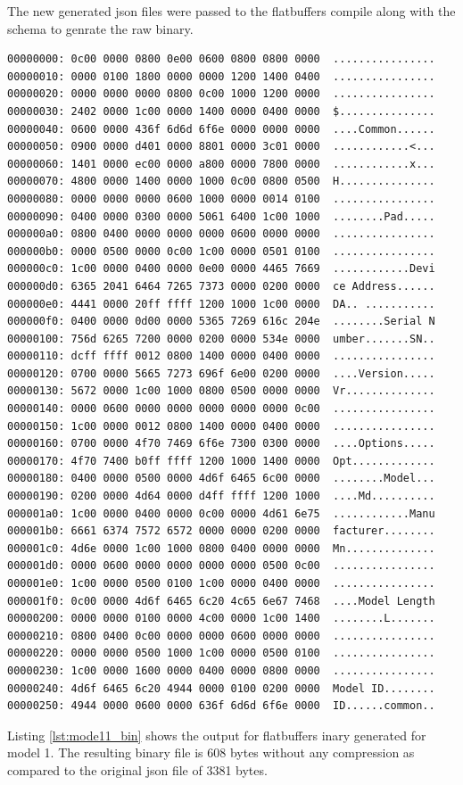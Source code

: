 \documentclass{article}
\begin{document}
The new generated json files were passed to the flatbuffers compile along with the schema to genrate the raw binary.

\begin{lstlisting}[caption={Generated Binary for Model 1}, label={lst:mode11_bin}]
00000000: 0c00 0000 0800 0e00 0600 0800 0800 0000  ................
00000010: 0000 0100 1800 0000 0000 1200 1400 0400  ................
00000020: 0000 0000 0000 0800 0c00 1000 1200 0000  ................
00000030: 2402 0000 1c00 0000 1400 0000 0400 0000  $...............
00000040: 0600 0000 436f 6d6d 6f6e 0000 0000 0000  ....Common......
00000050: 0900 0000 d401 0000 8801 0000 3c01 0000  ............<...
00000060: 1401 0000 ec00 0000 a800 0000 7800 0000  ............x...
00000070: 4800 0000 1400 0000 1000 0c00 0800 0500  H...............
00000080: 0000 0000 0000 0600 1000 0000 0014 0100  ................
00000090: 0400 0000 0300 0000 5061 6400 1c00 1000  ........Pad.....
000000a0: 0800 0400 0000 0000 0000 0600 0000 0000  ................
000000b0: 0000 0500 0000 0c00 1c00 0000 0501 0100  ................
000000c0: 1c00 0000 0400 0000 0e00 0000 4465 7669  ............Devi
000000d0: 6365 2041 6464 7265 7373 0000 0200 0000  ce Address......
000000e0: 4441 0000 20ff ffff 1200 1000 1c00 0000  DA.. ...........
000000f0: 0400 0000 0d00 0000 5365 7269 616c 204e  ........Serial N
00000100: 756d 6265 7200 0000 0200 0000 534e 0000  umber.......SN..
00000110: dcff ffff 0012 0800 1400 0000 0400 0000  ................
00000120: 0700 0000 5665 7273 696f 6e00 0200 0000  ....Version.....
00000130: 5672 0000 1c00 1000 0800 0500 0000 0000  Vr..............
00000140: 0000 0600 0000 0000 0000 0000 0000 0c00  ................
00000150: 1c00 0000 0012 0800 1400 0000 0400 0000  ................
00000160: 0700 0000 4f70 7469 6f6e 7300 0300 0000  ....Options.....
00000170: 4f70 7400 b0ff ffff 1200 1000 1400 0000  Opt.............
00000180: 0400 0000 0500 0000 4d6f 6465 6c00 0000  ........Model...
00000190: 0200 0000 4d64 0000 d4ff ffff 1200 1000  ....Md..........
000001a0: 1c00 0000 0400 0000 0c00 0000 4d61 6e75  ............Manu
000001b0: 6661 6374 7572 6572 0000 0000 0200 0000  facturer........
000001c0: 4d6e 0000 1c00 1000 0800 0400 0000 0000  Mn..............
000001d0: 0000 0600 0000 0000 0000 0000 0500 0c00  ................
000001e0: 1c00 0000 0500 0100 1c00 0000 0400 0000  ................
000001f0: 0c00 0000 4d6f 6465 6c20 4c65 6e67 7468  ....Model Length
00000200: 0000 0000 0100 0000 4c00 0000 1c00 1400  ........L.......
00000210: 0800 0400 0c00 0000 0000 0600 0000 0000  ................
00000220: 0000 0000 0500 1000 1c00 0000 0500 0100  ................
00000230: 1c00 0000 1600 0000 0400 0000 0800 0000  ................
00000240: 4d6f 6465 6c20 4944 0000 0100 0200 0000  Model ID........
00000250: 4944 0000 0600 0000 636f 6d6d 6f6e 0000  ID......common..
\end{lstlisting}
Listing \ref{lst:mode11_bin} shows the output for flatbuffers inary generated for model 1. The resulting binary file is 608 bytes without any compression as compared to the original json file of 3381 bytes.
\end{document}
